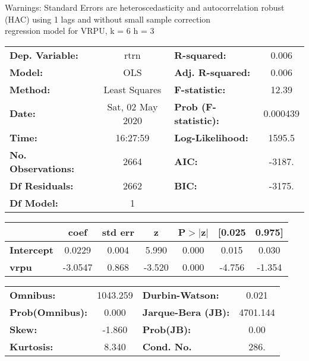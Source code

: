 Warnings: \newline
 [1] Standard Errors are heteroscedasticity and autocorrelation robust (HAC) using 1 lags and without small sample correction\\ 

regression model for VRPU, k = 6 h = 3\begin{center}
\begin{tabular}{lclc}
\toprule
\textbf{Dep. Variable:}    &       rtrn       & \textbf{  R-squared:         } &     0.006   \\
\textbf{Model:}            &       OLS        & \textbf{  Adj. R-squared:    } &     0.006   \\
\textbf{Method:}           &  Least Squares   & \textbf{  F-statistic:       } &     12.39   \\
\textbf{Date:}             & Sat, 02 May 2020 & \textbf{  Prob (F-statistic):} &  0.000439   \\
\textbf{Time:}             &     16:27:59     & \textbf{  Log-Likelihood:    } &    1595.5   \\
\textbf{No. Observations:} &        2664      & \textbf{  AIC:               } &    -3187.   \\
\textbf{Df Residuals:}     &        2662      & \textbf{  BIC:               } &    -3175.   \\
\textbf{Df Model:}         &           1      & \textbf{                     } &             \\
\bottomrule
\end{tabular}
\begin{tabular}{lcccccc}
                   & \textbf{coef} & \textbf{std err} & \textbf{z} & \textbf{P$> |$z$|$} & \textbf{[0.025} & \textbf{0.975]}  \\
\midrule
\textbf{Intercept} &       0.0229  &        0.004     &     5.990  &         0.000        &        0.015    &        0.030     \\
\textbf{vrpu}      &      -3.0547  &        0.868     &    -3.520  &         0.000        &       -4.756    &       -1.354     \\
\bottomrule
\end{tabular}
\begin{tabular}{lclc}
\textbf{Omnibus:}       & 1043.259 & \textbf{  Durbin-Watson:     } &    0.021  \\
\textbf{Prob(Omnibus):} &   0.000  & \textbf{  Jarque-Bera (JB):  } & 4701.144  \\
\textbf{Skew:}          &  -1.860  & \textbf{  Prob(JB):          } &     0.00  \\
\textbf{Kurtosis:}      &   8.340  & \textbf{  Cond. No.          } &     286.  \\
\bottomrule
\end{tabular}
\end{center}

